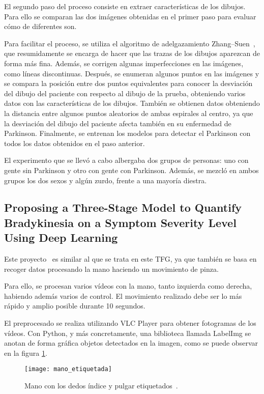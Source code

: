 El segundo paso del proceso consiste en extraer características de los dibujos. Para ello se comparan las dos imágenes obtenidas en el primer paso para evaluar cómo de diferentes son. 

Para facilitar el proceso, se utiliza el algoritmo de adelgazamiento Zhang–Suen~\cite{zhang1984fast}, que resumidamente se encarga de hacer que las trazas de los dibujos aparezcan de forma más fina. Además, se corrigen algunas imperfecciones en las imágenes, como líneas discontinuas. Después, se enumeran algunos puntos en las imágenes y se compara la posición entre dos puntos equivalentes para conocer la desviación del dibujo del paciente con respecto al dibujo de la prueba, obteniendo varios datos con las características de los dibujos. También se obtienen datos obteniendo la distancia entre algunos puntos aleatorios de ambas espirales al centro, ya que la desviación del dibujo del paciente afecta también en su enfermedad de Parkinson. Finalmente, se entrenan los modelos para detectar el Parkinson con todos los datos obtenidos en el paso anterior.

El experimento que se llevó a cabo albergaba dos grupos de personas: uno con gente sin Parkinson y otro con gente con Parkinson. Además, se mezcló en ambos grupos los dos sexos y algún zurdo, frente a una mayoría diestra.

\subsection{Proposing a Three-Stage Model to Quantify
	Bradykinesia on a Symptom Severity Level
	Using Deep Learning}
Este proyecto~\cite{jaber2021proposing} es similar al que se trata en este TFG, ya que también se basa en recoger datos procesando la mano haciendo un movimiento de pinza.

Para ello, se procesan varios vídeos con la mano, tanto izquierda como derecha, habiendo además varios de control. El movimiento realizado debe ser lo más rápido y amplio posible durante 10 segundos.

El preprocesado se realiza utilizando VLC Player para obtener fotogramas de los vídeos. Con Python, y más concretamente, una biblioteca llamada LabelImg se anotan de forma gráfica objetos detectados en la imagen, como se puede observar en la figura \ref{fig:manoetiquetada}.

\begin{figure}[]
	\texttt{[image: mano\_etiquetada]}
	\caption[Mano con los dedos índice y pulgar etiquetados.]{Mano con los dedos índice y pulgar etiquetados~\cite{jaber2021proposing}.}
	\label{fig:manoetiquetada}
\end{figure}

